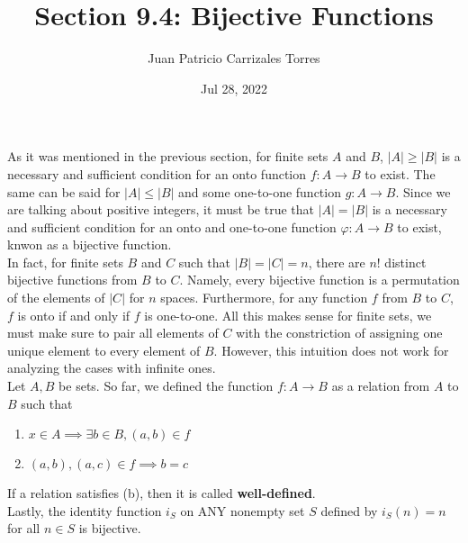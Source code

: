 \documentclass[12pt]{article}
\begin{document}
  
 \title{Section 9.4: Bijective Functions}
   \author{Juan Patricio Carrizales Torres}
     \date{Jul 28, 2022}
       \maketitle

       As it was mentioned in the previous section, for finite sets $A$ and $B$, $|A|\geq |B|$ is a necessary and sufficient condition for an onto function $f:A\to B$ to exist. The same can be said for $|A|\leq |B|$ and some one-to-one function $g:A\to B$. Since we are talking about positive integers, it must be true that $|A|=|B|$ is a necessary and sufficient condition for an onto and one-to-one function $\varphi:A\to B$ to exist, knwon as a bijective function. \\
       In fact, for finite sets $B$ and $C$ such that $|B|=|C|=n$, there are $n!$ distinct bijective functions from $B$ to $C$. Namely, every bijective function is a permutation of the elements of $|C|$ for $n$ spaces. Furthermore, for any function $f$ from $B$ to $C$, $f$ is onto if and only if $f$ is one-to-one. All this makes sense for finite sets, we must make sure to pair all elements of $C$ with the constriction of assigning one unique element to every element of $B$. However, this intuition does not work for analyzing the cases with infinite ones.\\
       Let $A,B$ be sets. So far, we defined the function $f:A\to B$ as a relation from $A$ to $B$ such that
    \begin{enumerate}
      \item $x\in A \implies \exists b\in B, (a,b)\in f$
      \item $(a,b),(a,c)\in f \implies b=c$
    \end{enumerate}
    If a relation satisfies (b), then it is called \textbf{well-defined}.\\
    Lastly, the identity function $i_{S}$ on ANY nonempty set $S$ defined by $i_{S}(n)=n$ for all $n\in S$ is bijective. 
\end{document}
